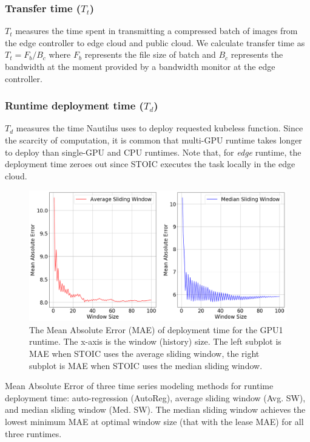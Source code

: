 \subsubsection{Transfer time ($T_t$)} 

$T_t$ measures the time spent in transmitting a compressed batch of images from the edge controller to edge cloud and public cloud. We calculate transfer time as ${T_t = F_b / B_c}$ where $F_b$ represents the file size of batch and $B_c$ represents the bandwidth at the moment provided by a bandwidth monitor at the edge controller. 
 
\subsubsection{Runtime deployment time ($T_d$)} 

$T_d$ measures the time Nautilus uses to deploy requested kubeless function. Since the scarcity of computation, it is common that multi-GPU runtime takes longer to deploy than single-GPU and CPU runtimes. Note that, for \textit{edge} runtime, the deployment time zeroes out since STOIC executes the task locally in the edge cloud.
 
\begin{figure}
    \centering
    \includegraphics[scale=0.31]{figures/deployment}
    \caption{The Mean Absolute Error (MAE) of deployment time for the GPU1 runtime. The x-axis is the window (history) size. The left subplot is MAE when STOIC uses the average sliding window, the right subplot is MAE when STOIC uses the median sliding window.
\label{fig:deployment}}
\end{figure}

 
\begin{table}
\centering
\resizebox{320pt}{!}{
}
\caption{Mean Absolute Error of three time series modeling methods for runtime deployment time: auto-regression (AutoReg), average sliding window (Avg. SW), and median sliding window (Med. SW). The median sliding window achieves the lowest minimum MAE at optimal window size (that with the lease MAE) for all three runtimes. \label{tab:deployment}}

\end{table}
 

